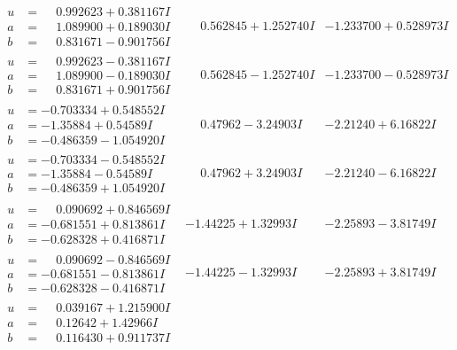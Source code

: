 \documentclass[1p]{elsarticle_modified}
\theoremstyle{definition}
\begin{document}
$$\begin{array}{c|c|c}
\begin{aligned}
u &= \phantom{-}0.992623 + 0.381167 I \\
a &= \phantom{-}1.089900 + 0.189030 I \\
b &= \phantom{-}0.831671 - 0.901756 I\end{aligned}
 & \phantom{-}0.562845 + 1.252740 I & -1.233700 + 0.528973 I \\ \hline\begin{aligned}
u &= \phantom{-}0.992623 - 0.381167 I \\
a &= \phantom{-}1.089900 - 0.189030 I \\
b &= \phantom{-}0.831671 + 0.901756 I\end{aligned}
 & \phantom{-}0.562845 - 1.252740 I & -1.233700 - 0.528973 I \\ \hline\begin{aligned}
u &= -0.703334 + 0.548552 I \\
a &= -1.35884 + 0.54589 I \\
b &= -0.486359 - 1.054920 I\end{aligned}
 & \phantom{-}0.47962 - 3.24903 I & -2.21240 + 6.16822 I \\ \hline\begin{aligned}
u &= -0.703334 - 0.548552 I \\
a &= -1.35884 - 0.54589 I \\
b &= -0.486359 + 1.054920 I\end{aligned}
 & \phantom{-}0.47962 + 3.24903 I & -2.21240 - 6.16822 I \\ \hline\begin{aligned}
u &= \phantom{-}0.090692 + 0.846569 I \\
a &= -0.681551 + 0.813861 I \\
b &= -0.628328 + 0.416871 I\end{aligned}
 & -1.44225 + 1.32993 I & -2.25893 - 3.81749 I \\ \hline\begin{aligned}
u &= \phantom{-}0.090692 - 0.846569 I \\
a &= -0.681551 - 0.813861 I \\
b &= -0.628328 - 0.416871 I\end{aligned}
 & -1.44225 - 1.32993 I & -2.25893 + 3.81749 I \\ \hline\begin{aligned}
u &= \phantom{-}0.039167 + 1.215900 I \\
a &= \phantom{-}0.12642 + 1.42966 I \\
b &= \phantom{-}0.116430 + 0.911737 I\end{aligned}

\end{array}$$
\end{document}
